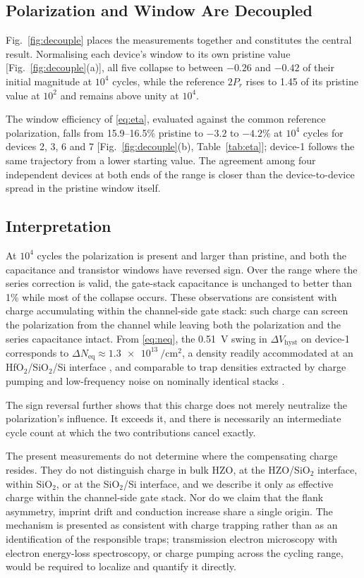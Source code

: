 \documentclass[journal]{IEEEtran}
\newcommand{\rev}[1]{{\color{blue}#1}}      %
\newcommand{\Prem}{P_r}
\newcommand{\Neq}{N_{\mathrm{eq}}}
\newcommand{\dVh}{\Delta V_{\mathrm{hyst}}}
\begin{document}
\subsection{Polarization and Window Are Decoupled}
\rev{Fig.~\ref{fig:decouple} places the measurements together and
constitutes the central result. Normalising each device's window to its
own pristine value [Fig.~\ref{fig:decouple}(a)], all five collapse to
between $-0.26$ and $-0.42$ of their initial magnitude at $10^4$ cycles,
while the reference $2\Prem$ rises to 1.45 of its pristine value at
$10^2$ and remains above unity at $10^4$.

The window efficiency of \eqref{eq:eta}, evaluated against the common
reference polarization, falls from 15.9--16.5\% pristine to $-3.2$ to
$-4.2$\% at $10^4$ cycles for devices 2, 3, 6 and 7
[Fig.~\ref{fig:decouple}(b), Table~\ref{tab:eta}]; device-1 follows the
same trajectory from a lower starting value. The agreement among four
independent devices at both ends of the range is closer than the
device-to-device spread in the pristine window itself.}

\subsection{Interpretation}
\rev{At $10^4$ cycles the polarization is present and larger than
pristine, and both the capacitance and transistor windows have reversed
sign. Over the range where the series correction is valid, the
gate-stack capacitance is unchanged to better than 1\% while most of the
collapse occurs. These observations are consistent with charge
accumulating within the channel-side gate stack: such charge can screen
the polarization from the channel while leaving both the polarization
and the series capacitance intact.} From \eqref{eq:neq}, the
\SI{0.51}{\volt} swing in $\dVh$ on device-1 corresponds to
$\Delta\Neq\approx\SI{1.3e13}{\per\centi\meter\squared}$, a density
readily accommodated at an HfO$_2$/SiO$_2$/Si interface
\cite{Ref_DD_1,Toprasertpong}, and comparable to trap densities
extracted by charge pumping and low-frequency noise on nominally
identical stacks \cite{Trapping_dynamics,Defect_dynamics}.

The sign reversal further shows that this charge does not merely
neutralize the polarization's influence. It exceeds it, and there is
necessarily an intermediate cycle count at which the two contributions
cancel exactly.

\rev{The present measurements do not determine where the compensating
charge resides. They do not distinguish charge in bulk HZO, at the
HZO/SiO$_2$ interface, within SiO$_2$, or at the SiO$_2$/Si interface,
and we describe it only as effective charge within the channel-side gate
stack. Nor do we claim that the flank asymmetry, imprint drift and
conduction increase share a single origin. The mechanism is presented as
consistent with charge trapping rather than as an identification of the
responsible traps; transmission electron microscopy with electron
energy-loss spectroscopy, or charge pumping across the cycling range,
would be required to localize and quantify it directly.}
\end{document}
